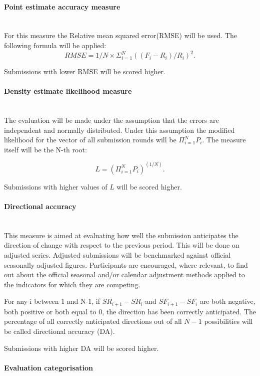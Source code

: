 \documentclass[12pt]{article}
\begin{document}
\paragraph{Point estimate accuracy measure}
\textbf{ }\\
For this measure the Relative mean squared error(RMSE) will be used. The following formula will be applied:
$$RMSE=1/N \times \Sigma_{i=1}^N ((F_i - R_i)/R_i)^2.$$

Submissions with lower RMSE will be scored higher.
\paragraph{Density estimate likelihood measure}
\textbf{ }\\

The evaluation will be made under the assumption that the errors are independent and normally distributed. Under this assumption the modified likelihood for the vector of all submission rounds will be $\Pi_{i=1}^N P_i$. The measure itself will be the N-th root:

$$L={(\Pi_{i=1}^N P_i)}^{(1/N)}.$$

Submissions with higher values of $L$ will be scored higher.

\paragraph{Directional accuracy}
\textbf{ }\\

This measure is aimed at evaluating how well the submission anticipates the direction of change with respect to the previous period. This will be done on adjusted series. Adjusted submissions will be benchmarked against official seasonally adjusted figures. Participants are encouraged, where relevant, to find out about the official seasonal and/or calendar adjustment methods applied to the indicators for which they are competing.

For any i between 1 and N-1, if $SR_{i+1} - SR_{i}$ and $SF_{i+1} - SF_i$ are both negative, both positive or both equal to 0, the direction has been correctly anticipated. The percentage of all correctly anticipated directions out of all $N-1$ possibilities will be called directional accuracy (DA).

Submissions with higher DA will be scored higher.

\paragraph{Evaluation categorisation}
\textbf{ }\\
\end{document}
